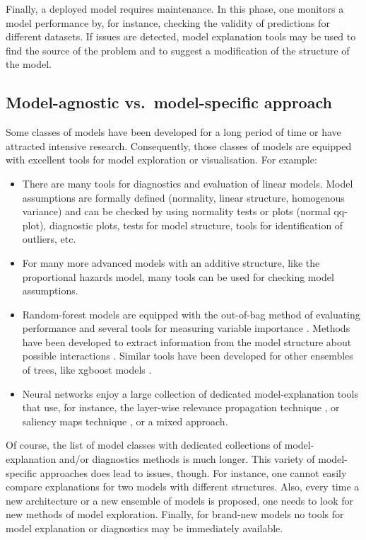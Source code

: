 \documentclass[12pt,]{krantz}
\providecommand{\tightlist}{%
  \setlength{\itemsep}{0pt}\setlength{\parskip}{0pt}}
\theoremstyle{definition}
\theoremstyle{definition}
\theoremstyle{definition}
\theoremstyle{remark}
\begin{document}
Finally, a deployed model requires maintenance. In this phase, one
monitors a model performance by, for instance, checking the validity of
predictions for different datasets. If issues are detected, model
explanation tools may be used to find the source of the problem and to
suggest a modification of the structure of the model.

\hypertarget{model-agnostic-vs.model-specific-approach}{%
\subsection{Model-agnostic vs.~model-specific
approach}\label{model-agnostic-vs.model-specific-approach}}

Some classes of models have been developed for a long period of time or
have attracted intensive research. Consequently, those classes of models
are equipped with excellent tools for model exploration or
visualisation. For example:

\begin{itemize}
\tightlist
\item
  There are many tools for diagnostics and evaluation of linear models.
  Model assumptions are formally defined (normality, linear structure,
  homogenous variance) and can be checked by using normality tests or
  plots (normal qq-plot), diagnostic plots, tests for model structure,
  tools for identification of outliers, etc.
\item
  For many more advanced models with an additive structure, like the
  proportional hazards model, many tools can be used for checking model
  assumptions.
\item
  Random-forest models are equipped with the out-of-bag method of
  evaluating performance and several tools for measuring variable
  importance \citep{R-randomForest}. Methods have been developed to
  extract information from the model structure about possible
  interactions \citep{R-randomForestExplainer}. Similar tools have been
  developed for other ensembles of trees, like xgboost models
  \citep{R-xgboostExplainer}.
\item
  Neural networks enjoy a large collection of dedicated
  model-explanation tools that use, for instance, the layer-wise
  relevance propagation technique \citep{BachLWRP}, or saliency maps
  technique \citep{SaliencyMaps}, or a mixed approach.
\end{itemize}

Of course, the list of model classes with dedicated collections of
model-explanation and/or diagnostics methods is much longer. This
variety of model-specific approaches does lead to issues, though. For
instance, one cannot easily compare explanations for two models with
different structures. Also, every time a new architecture or a new
ensemble of models is proposed, one needs to look for new methods of
model exploration. Finally, for brand-new models no tools for model
explanation or diagnostics may be immediately available.
\end{document}
